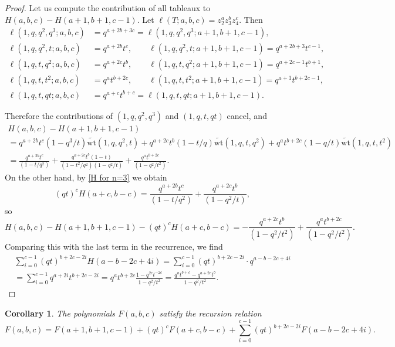 \documentclass[11pt,reqno]{amsart}
\newcommand{\wt}{\mathrm{wt}}
\newcommand{\twt}{\widetilde{\wt}}
\newtheorem{corollary}[theorem]{Corollary}
\theoremstyle{definition}
\numberwithin{equation}{section}
\begin{document}
\begin{proof}
Let us compute the contribution of all  tableaux to $H(a,b,c)-H(a+1,b+1,c-1)$. Let $\ell(T;a,b,c)=z_2^az_3^bz_4^c.$
Then
\begin{equation*}
\begin{split}
	\ell(1,q,q^2,q^3;a,b,c)&=q^{a+2b+3c}=\ell(1,q,q^2,q^3;a+1,b+1,c-1),\\
	\ell(1,q,q^2,t;a,b,c)&=q^{a+2b}t^{c}, \qquad \ell(1,q,q^2,t;a+1,b+1,c-1)=q^{a+2b+3}t^{c-1},\\
	\ell(1,q,t,q^2;a,b,c)&=q^{a+2c}t^{b}, \qquad \ell(1,q,t,q^2;a+1,b+1,c-1)=q^{a+2c-1}t^{b+1},\\
	\ell(1,q,t,t^2;a,b,c)&=q^{a}t^{b+2c}, \qquad \ell(1,q,t,t^2;a+1,b+1,c-1)=q^{a+1}t^{b+2c-1},\\
	\ell(1,q,t,qt;a,b,c)&=q^{a+c}t^{b+c}=\ell(1,q,t,qt;a+1,b+1,c-1).
\end{split}
\end{equation*}

Therefore the contributions of $(1,q,q^2,q^3)$ and $(1,q,t,qt)$ cancel, and
\begin{multline*}
	H(a,b,c)-H(a+1,b+1,c-1)\\
	=q^{a+2b}t^{c}(1-q^3/t)\twt(1,q,q^2,t)+q^{a+2c}t^{b}(1-t/q)\twt(1,q,t,q^2)+q^{a}t^{b+2c}(1-q/t)\twt(1,q,t,t^2)\\
	=\frac{q^{a+2b}t^{c}}{(1-t/q^2)}+\frac{q^{a+2c}t^{b}(1-t)}{(1-t^2/q^2)(1-q^2/t)}+\frac{q^{a}t^{b+2c}}{(1-q^2/t^2)}.
\end{multline*}
On the other hand, by \eqref{H for n=3} we obtain
$$
	(qt)^cH(a+c,b-c)=\frac{q^{a+2b}t^c}{(1-t/q^2)}+\frac{q^{a+2c}t^{b}}{(1-q^2/t)},
$$
so 
$$
	H(a,b,c)-H(a+1,b+1,c-1)-(qt)^cH(a+c,b-c)=-\frac{q^{a+2c}t^{b}}{(1-q^2/t^2)}+\frac{q^{a}t^{b+2c}}{(1-q^2/t^2)}.
$$
Comparing this with the last term in the recurrence, we find
\begin{multline*}
	\sum_{i=0}^{c-1}(qt)^{b+2c-2i}H(a-b-2c+4i)=\sum_{i=0}^{c-1}(qt)^{b+2c-2i}\cdot q^{a-b-2c+4i}\\
	=\sum_{i=0}^{c-1}q^{a+2i}t^{b+2c-2i}=q^{a}t^{b+2c}\frac{1-q^{2c}t^{-2c}}{1-q^2/t^2}
	=\frac{q^{a}t^{b+c}-q^{a+2c}t^b}{1-q^2/t^2}.
\end{multline*}
\end{proof}

\begin{corollary}
\label{corollary.recursion}
The polynomials $F(a,b,c)$ satisfy the recursion relation
$$
	F(a,b,c)=F(a+1,b+1,c-1)+(qt)^cF(a+c,b-c)+\sum_{i=0}^{c-1}(qt)^{b+2c-2i}F(a-b-2c+4i).
$$
\end{corollary}
\end{document}
